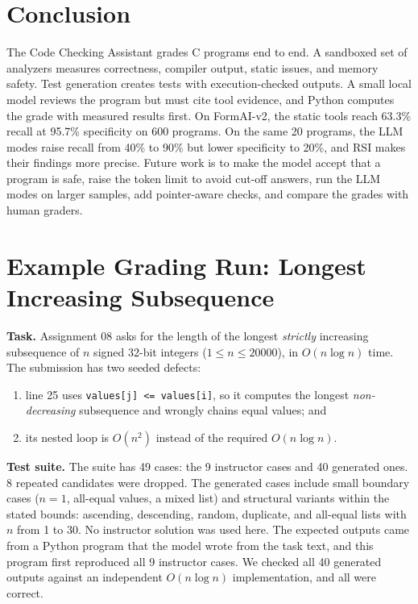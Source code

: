 \documentclass[conference]{IEEEtran}
\begin{document}
\section{Conclusion}
The Code Checking Assistant grades C programs end to end. A sandboxed set of
analyzers measures correctness, compiler output, static issues, and memory
safety. Test generation creates tests with execution-checked outputs. A small
local model reviews the program but must cite tool evidence, and Python computes
the grade with measured results first. On FormAI-v2, the static tools reach
63.3\% recall at 95.7\% specificity on 600 programs. On the same 20 programs,
the LLM modes raise recall from 40\% to 90\% but lower specificity to 20\%, and
RSI makes their findings more precise. Future work is to make the model accept
that a program is safe, raise the token limit to avoid cut-off answers, run the
LLM modes on larger samples, add pointer-aware checks, and compare the grades
with human graders.

\appendix
\section*{Example Grading Run: Longest Increasing Subsequence}
\label{app:lis}

\textbf{Task.} Assignment 08 asks for the length of the longest \emph{strictly}
increasing subsequence of $n$ signed 32-bit integers ($1\le n\le 20000$), in
$O(n\log n)$ time. The submission has two seeded defects:
\begin{enumerate}
  \item line 25 uses \texttt{values[j] <= values[i]}, so it computes the longest
        \emph{non-decreasing} subsequence and wrongly chains equal values; and
  \item its nested loop is $O(n^2)$ instead of the required $O(n\log n)$.
\end{enumerate}

\textbf{Test suite.} The suite has 49 cases: the 9 instructor cases and 40
generated ones. 8 repeated candidates were dropped. The generated cases include
small boundary cases ($n=1$, all-equal values, a mixed list) and structural
variants within the stated bounds: ascending, descending, random, duplicate, and
all-equal lists with $n$ from 1 to 30. No instructor solution was used here. The
expected outputs came from a Python program that the model wrote from the task
text, and this program first reproduced all 9 instructor cases. We checked all
40 generated outputs against an independent $O(n\log n)$ implementation, and all
were correct.
\end{document}
